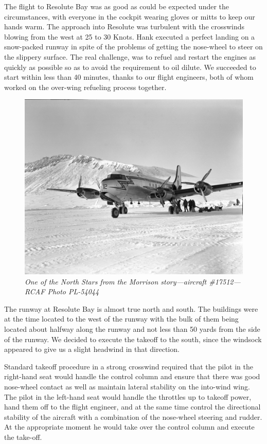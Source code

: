 The flight to Resolute Bay was as good as could be expected under the
circumstances, with everyone in the cockpit wearing gloves or mitts to
keep our hands warm. The approach into Resolute was turbulent with the
crosswinds blowing from the west at 25 to 30 Knots. Hank executed a
perfect landing on a snow-packed runway in spite of the problems of
getting the nose-wheel to steer on the slippery surface. The real
challenge, was to refuel and restart the engines as quickly as possible
so as to avoid the requirement to oil dilute. We succeeded to start
within less than 40 minutes, thanks to our flight engineers, both of
whom worked on the over-wing refueling process together.

\begin{figure}[httb]
   \vspace{2em}
   \centering
   \includegraphics [scale=0.5]{alert-PL-54044.png}
   \caption*{\small \em One of the North Stars from the Morrison story---aircraft \#17512---RCAF Photo PL-54044}
   \label{fig:wall-two}
\end{figure}

The runway at Resolute Bay is almost true north and south. The
buildings were at the time located to the west of the runway with the
bulk of them being located about halfway along the runway and not less
than 50 yards from the side of the runway. We decided to execute the
takeoff to the south, since the windsock appeared to give us a slight
headwind in that direction.

Standard takeoff procedure in a strong crosswind required that the
pilot in the right-hand seat would handle the control column and ensure
that there was good nose-wheel contact as well as maintain lateral
stability on the into-wind wing. The pilot in the left-hand seat would
handle the throttles up to takeoff power, hand them off to the flight
engineer, and at the same time control the directional stability of the
aircraft with a combination of the nose-wheel steering and rudder. At
the appropriate moment he would take over the control column and
execute the take-off.


